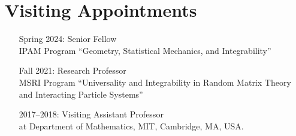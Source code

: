 \documentclass[letterpaper,11pt]{article}
\begin{document}
\section*{Visiting Appointments}

\begin{itemize}
	\item [Spring 2024:]
		  Senior Fellow
		  \\
		  IPAM Program ``Geometry, Statistical Mechanics, and Integrability''
	\item [Fall 2021:]
		  Research Professor
		  \\
		  MSRI Program ``Universality and Integrability in Random Matrix Theory and Interacting Particle Systems''
	\item
	      [2017--2018:]
	      Visiting Assistant Professor\\ at Department of Mathematics, MIT, 
	      Cambridge, MA, USA.
\end{itemize}
\end{document}
